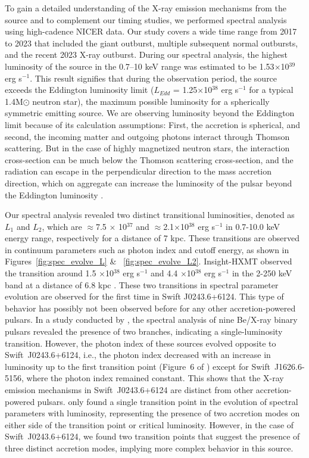 \documentclass[twocolumn,trackchanges]{aastex631}
\begin{document}
To gain a detailed understanding of the X-ray emission mechanisms from the source and to complement our timing studies, we performed spectral analysis using high-cadence NICER data.  Our study covers a wide time range from 2017 to 2023 that included the giant outburst, multiple subsequent normal outbursts, and the recent 2023 X-ray outburst. During our spectral analysis, the highest luminosity of the source in the 0.7--10 keV range was estimated to be 1.53$\times$10$^{39}$ erg s$^{-1}$. This result signifies that during the observation period, the source exceeds the Eddington luminosity limit ($L_{Edd}$ = 1.25$\times$10$^{38}$ erg s$^{-1}$ for a typical 1.4M$\odot$ neutron star), the maximum possible luminosity for a spherically symmetric emitting source. We are observing luminosity beyond the Eddington limit because of its calculation assumptions: First, the accretion is spherical, and second, the incoming matter and outgoing photons interact through Thomson scattering. But in the case of highly magnetized neutron stars, the interaction cross-section can be much below the Thomson scattering cross-section, and the radiation can escape in the perpendicular direction to the mass accretion direction, which on aggregate can increase the luminosity of the pulsar beyond the Eddington luminosity \citep{1976MNRAS.175..395B}. 


Our spectral analysis revealed two distinct transitional luminosities, denoted as $L_{1}$ and $L_{2}$, which are $\approx$7.5 $\times$ 10$^{37}$ and $\approx$2.1$\times$10$^{38}$ erg s$^{-1}$ in 0.7-10.0 keV energy range, respectively for a distance of 7 kpc. These transitions are observed in continuum parameters such as photon index and cutoff energy, as shown in Figures~\ref{fig:spec_evolve_L} \& ~\ref{fig:spec_evolve_L2}. Insight-HXMT observed the transition around 1.5 $\times$10$^{38}$ erg s$^{-1}$ and  4.4 $\times$10$^{38}$ erg s$^{-1}$ in the 2-250 keV band at a distance of 6.8 kpc \citep{2020ApJ...902...18K}. These two transitions in spectral parameter evolution are observed for the first time in Swift J0243.6+6124. This type of behavior has possibly not been observed before for any other accretion-powered pulsars. In a study conducted by \citet{2013A&A...551A...1R}, the spectral analysis of nine Be/X-ray binary pulsars revealed the presence of two branches, indicating a single-luminosity transition. However, the photon index of these sources evolved opposite to Swift~J0243.6+6124, i.e., the photon index decreased with an increase in luminosity up to the first transition point (Figure~6 of \citealt{2013A&A...551A...1R}) except for Swift~J1626.6-5156, where the photon index remained constant. This shows that the X-ray emission mechanisms in  Swift~J0243.6+6124 are distinct from other accretion-powered pulsars. \citet{2013A&A...551A...1R} only found a single transition point in the evolution of spectral parameters with luminosity, representing the presence of two accretion modes on either side of the transition point or critical luminosity. However, in the case of Swift~J0243.6+6124, we found two transition points that suggest the presence of three distinct accretion modes, implying more complex behavior in this source.
\end{document}

